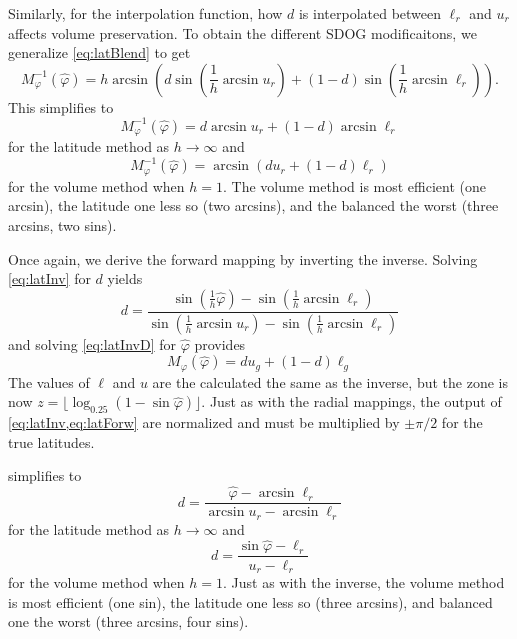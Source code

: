 Similarly, for the interpolation function, how $d$ is interpolated between $\ell_r$ and $u_r$ affects volume preservation.
To obtain the different SDOG modificaitons, we generalize \cref{eq:latBlend} to get
%
\begin{equation} \label{eq:latInv}
M_\varphi^{-1}(\hat{\varphi}) = h \arcsin \left( d \sin \left( \frac{1}{h} \arcsin u_r \right) + \left( 1 - d \right) \sin \left( \frac{1}{h} \arcsin \ell_r \right) \right).
\end{equation}
%
This simplifies to
%
\begin{equation*}
M_\varphi^{-1}(\hat{\varphi}) = d \arcsin u_r  + \left( 1 - d \right) \arcsin \ell_r
\end{equation*}
%
for the latitude method as $h \rightarrow \infty$ and
%
\begin{equation*}
M_\varphi^{-1}(\hat{\varphi}) = \arcsin \left( d u_r + \left( 1 - d \right) \ell_r \right)
\end{equation*}
%
for the volume method when $h = 1$.
The volume method is most efficient (one arcsin), the latitude one less so (two arcsins), and the balanced the worst (three arcsins, two sins).


Once again, we derive the forward mapping by inverting the inverse.
Solving \cref{eq:latInv} for $d$ yields
%
\begin{equation} \label{latForwD}
d = \frac{ \sin \left( \frac{1}{h} \hat{\varphi} \right) - \sin \left( \frac{1}{h} \arcsin \ell_r \right) }{ \sin \left( \frac{1}{h} \arcsin u_r \right) - \sin \left( \frac{1}{h} \arcsin \ell_r \right) }
\end{equation}
%
and solving \cref{eq:latInvD} for $\hat{\varphi}$ provides
%
\begin{equation} \label{eq:latForw}
M_\varphi (\hat{\varphi}) = d u_g + \left( 1 - d \right) \ell_g
\end{equation}
%
The values of $\ell$ and $u$ are the calculated the same as the inverse, but the zone is now $z = \lfloor \log_{0.25} ( 1 - \sin \hat{\varphi} ) \rfloor$.
Just as with the radial mappings, the output of \cref{eq:latInv,eq:latForw} are normalized and must be multiplied by $\pm \pi / 2$ for the true latitudes.


 simplifies to
%
\begin{equation*}
d = \frac{ \hat{\varphi} - \arcsin \ell_r }{ \arcsin u_r - \arcsin \ell_r}
\end{equation*}
%
for the latitude method as $h \rightarrow \infty$ and
%
\begin{equation*}
d = \frac{ \sin \hat{\varphi} - \ell_r }{ u_r - \ell_r }
\end{equation*}
%
for the volume method when $h = 1$.
Just as with the inverse, the volume method is most efficient (one sin), the latitude one less so (three arcsins), and balanced one the worst (three arcsins, four sins).


